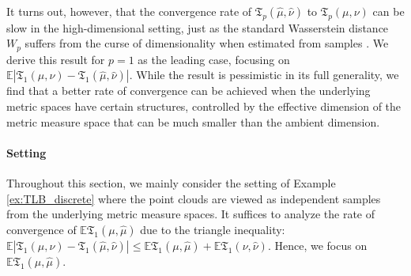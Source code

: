 \documentclass[11pt,letterpaper]{article}
\theoremstyle{definition}
\numberwithin{equation}{section}
\newcommand{\E}{\mathbb{E}} %
\begin{document}
It turns out, however, that the convergence rate of $\mathfrak{T}_p(\hat{\mu}, \hat{\nu})$ to $\mathfrak{T}_p(\mu, \nu)$ can be slow in the high-dimensional setting, just as the standard Wasserstein distance $W_p$ suffers from the curse of dimensionality when estimated from samples \citep{dudley1969speed,dereich2013constructive,boissard2014mean,fournier2015rate,weed2019sharp}. We derive this result for $p = 1$ as the leading case, focusing on $\E |\mathfrak{T}_1(\mu, \nu) - \mathfrak{T}_1(\hat{\mu}, \hat{\nu})|$. While the result is pessimistic in its full generality, we find that a better rate of convergence can be achieved when the underlying metric spaces have certain structures, controlled by the effective dimension of the metric measure space that can be much smaller than the ambient dimension.

\paragraph{Setting} Throughout this section, we mainly consider the setting of Example \ref{ex:TLB_discrete} where the point clouds are viewed as independent samples from the underlying metric measure spaces. It suffices to analyze the rate of convergence of $\E \mathfrak{T}_1(\mu, \hat{\mu})$ due to the triangle inequality: $\E |\mathfrak{T}_1(\mu, \nu) - \mathfrak{T}_1(\hat{\mu}, \hat{\nu})| \le \E \mathfrak{T}_1(\mu, \hat{\mu}) + \E \mathfrak{T}_1(\nu, \hat{\nu})$. Hence, we focus on $\E \mathfrak{T}_1(\mu, \hat{\mu})$. 
\end{document}
